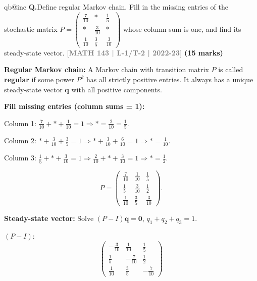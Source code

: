 \documentclass[12pt,a3paper]{article}
\makeatletter
\newcommand{\yr}[1]{\hfill\textcolor{gray}{\small\textbf{[#1]}}}
\newcommand{\mk}[1]{\textcolor{orange!70!black}{\small\textbf{(#1 marks)}}}
\newcounter{qnum}
\newcommand{\Q}[1]{%
  \csname qb@inc\endcsname
  \needspace{4\baselineskip}
  \refstepcounter{qnum}
  \vspace{6pt}
  \noindent\textbf{Q\theqnum.}\enspace #1\par
}
\makeatother
\begin{document}
 

\Q{Define regular Markov chain. Fill in the missing entries of the stochastic matrix
$P = \begin{pmatrix} \frac{7}{10} & * & \frac{1}{5} \\ * & \frac{3}{10} & * \\ \frac{1}{10} & \frac{3}{5} & \frac{3}{10} \end{pmatrix}$
whose column sum is one, and find its steady-state vector.
\yr{MATH 143 | L-1/T-2 | 2022-23} \mk{15}}

\begin{tcolorbox}[enhanced,breakable,
  colback=cA!4,colframe=cA,boxrule=0.8pt,arc=5pt,
  title={\textbf{Answer --- Regular Markov Chain; Missing Entries; Steady-State Vector}},
  fonttitle=\bfseries\color{white},colbacktitle=cA]
 
\textbf{Regular Markov chain:} A Markov chain with transition matrix $P$ is called \textbf{regular} if some power $P^k$ has all strictly positive entries.
It always has a unique steady-state vector $\mathbf{q}$ with all positive components.
 
\medskip
\textbf{Fill missing entries (column sums = 1):}
 
Column 1: $\frac{7}{10} + * + \frac{1}{10} = 1 \Rightarrow * = \frac{2}{10} = \frac{1}{5}$.
 
Column 2: $* + \frac{3}{10} + \frac{3}{5} = 1 \Rightarrow * + \frac{3}{10} + \frac{6}{10} = 1 \Rightarrow * = \frac{1}{10}$.
 
Column 3: $\frac{1}{5} + * + \frac{3}{10} = 1 \Rightarrow \frac{2}{10} + * + \frac{3}{10} = 1 \Rightarrow * = \frac{1}{2}$.
 
\[
P = \begin{pmatrix}\frac{7}{10}&\frac{1}{10}&\frac{1}{5}\\\frac{1}{5}&\frac{3}{10}&\frac{1}{2}\\\frac{1}{10}&\frac{3}{5}&\frac{3}{10}\end{pmatrix}.
\]
 
\textbf{Steady-state vector:} Solve $(P-I)\mathbf{q}=\mathbf{0}$, $q_1+q_2+q_3=1$.
 
$(P-I)$:
\[
\begin{pmatrix}-\frac{3}{10}&\frac{1}{10}&\frac{1}{5}\\\frac{1}{5}&-\frac{7}{10}&\frac{1}{2}\\\frac{1}{10}&\frac{3}{5}&-\frac{7}{10}\end{pmatrix}
\]
 

\end{tcolorbox}
\end{document}
